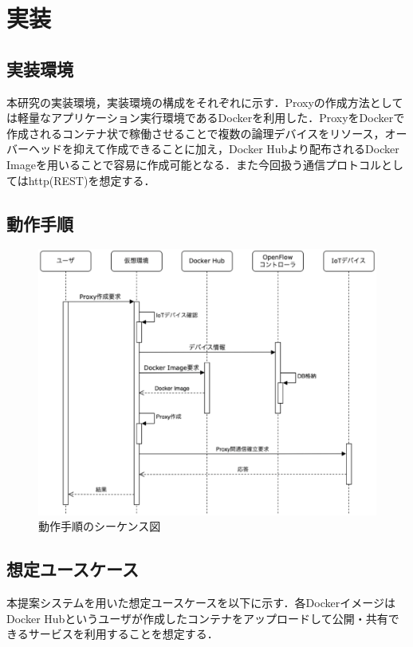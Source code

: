 \documentclass[Japanese]{dicomopapers}
\begin{document}
\section{実装}
\subsection{実装環境}
本研究の実装環境，実装環境の構成をそれぞれに示す．Proxyの作成方法としては軽量なアプリケーション実行環境であるDockerを利用した．ProxyをDockerで作成されるコンテナ状で稼働させることで複数の論理デバイスをリソース，オーバーヘッドを抑えて作成できることに加え，Docker Hubより配布されるDocker Imageを用いることで容易に作成可能となる．また今回扱う通信プロトコルとしてはhttp(REST)を想定する．

\subsection{動作手順}

\begin{figure}[!tb]
	\centering
	\includegraphics[width=\linewidth]{img/seaquence.eps}
	\caption{動作手順のシーケンス図}
	\label{fig:seaquence}
\end{figure}

\subsection{想定ユースケース}
本提案システムを用いた想定ユースケースを以下に示す．各DockerイメージはDocker Hubというユーザが作成したコンテナをアップロードして公開・共有できるサービスを利用することを想定する．
\end{document}
